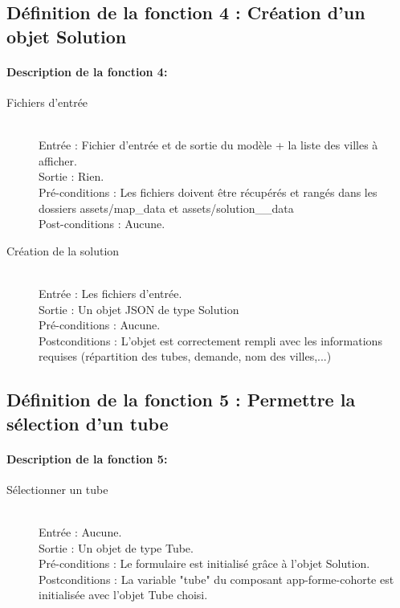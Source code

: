 \documentclass{polytech/polytech}
\numberwithin{figure}{chapter}
\begin{document}
\begin{appendix}
\subsection{Définition de la fonction 4 : Création d'un objet Solution}

\paragraph{Description de la fonction 4:}

\begin{description}
    \item[Fichiers d'entrée] ~ \\
        Entrée : Fichier d'entrée et de sortie du modèle + la liste des villes à afficher.\\ 
        Sortie : Rien.\\
        Pré-conditions : Les fichiers doivent être récupérés et rangés dans les dossiers assets/map\_data et assets/solution\__data\\
        Post-conditions : Aucune.

    \item[Création de la solution] ~ \\
        Entrée : Les fichiers d'entrée.\\ 
        Sortie : Un objet JSON de type Solution\\
        Pré-conditions : Aucune.\\
        Postconditions : L'objet est correctement rempli avec les informations requises (répartition des tubes, demande, nom des villes,...)
\end{description}

\subsection{Définition de la fonction 5 : Permettre la sélection d'un tube}

\paragraph{Description de la fonction 5:}

\begin{description}
    \item[Sélectionner un tube] ~ \\
        Entrée : Aucune.\\ 
        Sortie : Un objet de type Tube.\\
        Pré-conditions : Le formulaire est initialisé grâce à l'objet Solution.\\
        Postconditions : La variable "tube" du composant app-forme-cohorte est initialisée avec l'objet Tube choisi.
\end{description}


\end{appendix}
\end{document}
